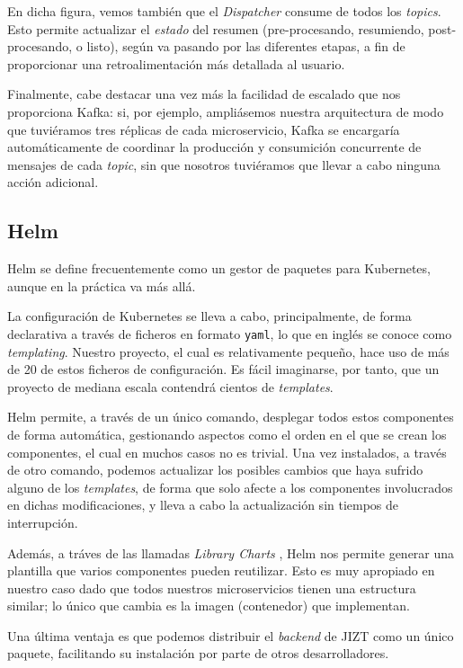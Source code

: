 En dicha figura, vemos también que el \emph{Dispatcher} consume de todos los \emph{topics}. Esto permite actualizar el \emph{estado} del resumen (pre-procesando, resumiendo, post-procesando, o listo), según va pasando por las diferentes etapas, a fin de proporcionar una retroalimentación más detallada al usuario.

Finalmente, cabe destacar una vez más la facilidad de escalado que nos proporciona Kafka: si, por ejemplo, ampliásemos nuestra arquitectura de modo que tuviéramos tres réplicas de cada microservicio, Kafka se encargaría automáticamente de coordinar la producción y consumición concurrente de mensajes de cada \emph{topic}, sin que nosotros tuviéramos que llevar a cabo ninguna acción adicional.

\subsection{Helm}

Helm se define frecuentemente como un gestor de paquetes para Kubernetes, aunque en la práctica va más allá.

La configuración de Kubernetes se lleva a cabo, principalmente, de forma declarativa a través de ficheros en formato \texttt{yaml}, lo que en inglés se conoce como \emph{templating}. Nuestro proyecto, el cual es relativamente pequeño, hace uso de más de 20 de estos ficheros de configuración. Es fácil imaginarse, por tanto, que un proyecto de mediana escala contendrá cientos de \emph{templates}.

Helm permite, a través de un único comando, desplegar todos estos componentes de forma automática, gestionando aspectos como el orden en el que se crean los componentes, el cual en muchos casos no es trivial. Una vez instalados, a través de otro comando, podemos actualizar los posibles cambios que haya sufrido alguno de los \emph{templates}, de forma que solo afecte a los componentes involucrados en dichas modificaciones, y lleva a cabo la actualización sin tiempos de interrupción.

Además, a tráves de las llamadas \emph{Library Charts} \cite{helm-lib-charts}, Helm nos permite generar una plantilla que varios componentes pueden reutilizar. Esto es muy apropiado en nuestro caso dado que todos nuestros microservicios tienen una estructura similar; lo único que cambia es la imagen (contenedor) que implementan.

Una última ventaja es que podemos distribuir el \emph{backend} de JIZT como un único paquete, facilitando su instalación por parte de otros desarrolladores.


